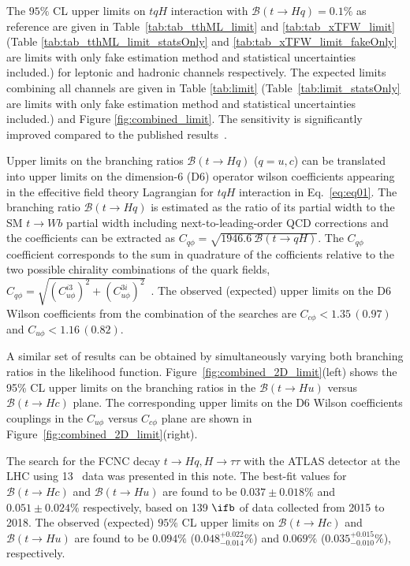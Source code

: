 The $95\%$ CL upper limits on $tqH$ interaction with $\mathcal{B}(t\to Hq)=0.1\%$ as reference are given in Table~\ref{tab:tab_tthML_limit} and \ref{tab:tab_xTFW_limit} (Table \ref{tab:tab_tthML_limit_statsOnly} and \ref{tab:tab_xTFW_limit_fakeOnly} are limits with only fake estimation method and statistical uncertainties included.) for leptonic and hadronic channels respectively. The expected limits combining all channels are given in Table \ref{tab:limit} (Table~\ref{tab:limit_statsOnly} are limits with only fake estimation method and statistical uncertainties included.) and Figure \ref{fig:combined_limit}. The sensitivity is significantly improved compared to the published results~\cite{fcncgmgm,fcncml,fcnctautau}. 

Upper limits on the branching ratios $\mathcal{B}(t\to Hq)$ ($q=u,c$) can be translated into upper limits on the dimension-6 (D6) operator wilson coefficients appearing in the effecitive field theory Lagrangian for $tqH$ interaction in Eq.~\ref{eq:eq01}.
The branching ratio $\mathcal{B}(t\to Hq)$ is estimated as the ratio of its partial width to the SM $t \to Wb$ partial width including next-to-leading-order QCD corrections and the coefficients can be extracted as $C_{q\phi} = \sqrt{1946.6~\mathcal{B}(t\to qH)}$.
The $C_{q\phi}$ coefficient corresponds to the sum in quadrature of the cofficients relative to the two possible chirality combinations of the quark fields,
$C_{q\phi} =\sqrt{(C^{i3}_{u\phi})^2 + (C^{3i}_{u\phi})^2}$~\cite{fcnc_production_theory}. The observed (expected) upper limits on the D6 Wilson coefficients from the combination of the searches are $C_{c\phi}<1.35\,(0.97)$ and $C_{u\phi}<1.16\,(0.82)$.

A similar set of results can be obtained by simultaneously varying both branching ratios in the likelihood function. Figure~\ref{fig:combined_2D_limit}(left) shows the 95\% CL upper limits on the branching ratios in the $\mathcal{B}(t\rightarrow Hu)$
versus $\mathcal{B}(t\rightarrow Hc)$ plane. The corresponding upper limits on the D6 Wilson coefficients couplings in the $C_{u\phi}$ versus $C_{c\phi}$ plane are shown in Figure~\ref{fig:combined_2D_limit}(right).

The search for the FCNC decay $t\to Hq, H\to\tau\tau$ with the ATLAS detector at the LHC using 13~\TeV{} data was presented in this note. The best-fit values for $\mathcal{B}(t\to Hc)$ and $\mathcal{B}(t\to Hu)$ are found to be $0.037\pm0.018\%$ and $0.051\pm0.024\%$ respectively, based on 139 $\ifb$ of data collected from 2015 to 2018. The observed (expected) $95\%$ CL upper limits on $\mathcal{B}(t\to Hc)$ and $\mathcal{B}(t\to Hu)$ are found to be $0.094\%$ ($0.048^{+0.022}_{-0.014}\%$) and $0.069\%$ ($0.035^{+0.015}_{-0.010}\%$), respectively.

